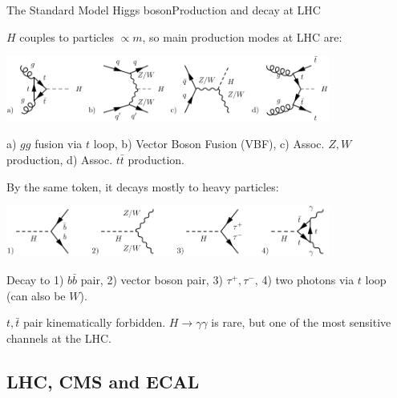 \documentclass{beamer}
\begin{document}
\begin{frame}{The Standard Model Higgs boson}{Production and decay at LHC}
\begin{itemize}
\item 
{\tiny $H$ couples to particles $\propto m$, so main production modes at LHC are:}
\begin{center}
\includegraphics[width=0.8\textwidth]{"productions"}
\item {\tiny a) $gg$ fusion via $t$ loop, b) Vector Boson Fusion (VBF), c) Assoc. $Z,W$ production, d) Assoc. $t\bar{t}$ production.}
\end{center}
\pause
\item 
{\tiny By the same token, it decays mostly to heavy particles:}
\begin{center}
\includegraphics[width=0.8\textwidth]{"decays"}
\item {\tiny Decay to 1) $b \bar{b}$ pair, 2) vector boson pair, 3) $\tau^+, \tau^-$, 4) two photons via $t$ loop (can also be $W$).}
\end{center}
\item {\tiny $t, \bar{t}$ pair kinematically forbidden. $H \rightarrow \gamma \gamma $ is rare, but one of the most sensitive channels at the LHC.}

\end{itemize}
\end{frame}


\subsection{LHC, CMS and ECAL}
\end{document}
